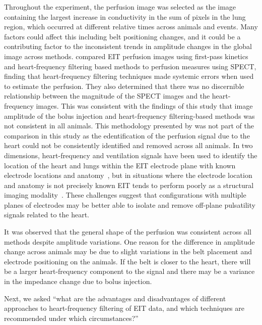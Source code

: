 Throughout the experiment, 
the perfusion image was selected as the image containing 
the largest increase in conductivity in the sum of pixels 
in the lung region, which occurred 
at different relative times across animals and events. Many factors could affect this
including belt positioning changes, and it could be a contributing factor 
to the inconsistent trends in amplitude changes in the global image across methods.
compared EIT perfusion images using first-pass kinetics and 
heart-frequency filtering based methods to perfusion measures using SPECT,
finding that heart-frequency filtering
techniques made systemic errors when used to estimate the perfusion. They also 
determined that there was no discernible relationship between the magnitude of the
SPECT images and the heart-frequency images.
This was consistent with the findings of this study that image amplitude of the bolus injection and 
heart-frequency filtering-based methods was not consistent in all animals.
This methodology presented by 
was not part of the comparison in this study as the edentification of the 
perfusion signal due to the heart could not be consistently
identified and removed across all animals.
In two dimensions, heart-frequency and ventilation signals 
have been used to identify the location 
of the heart and lungs within the EIT electrode plane with known electrode 
locations and anatomy~\parencite{ferrario_toward_2012}, but in situations where the electrode 
location and anatomy is not precisely known EIT tends to perform poorly as a structural 
imaging modality~\parencite{adler_electrical_2017}.
These challenges suggest that configurations with multiple planes of electrodes 
may be better able to isolate and remove off-plane 
pulsatility signals related to the heart.

It was observed that the general shape of 
the perfusion was consistent across all methods despite amplitude variations. 
One reason for the difference in amplitude change across animals may be due 
to slight variations in the belt placement and electrode positioning on the animals.
If the belt is closer to the heart, there will be a larger heart-frequency component 
to the signal and there may be a variance in the impedance change due to bolus injection.

Next, we asked ``what are the advantages and disadvantages of different approaches
to heart-frequency filtering of EIT data, and which techniques are recommended
under which circumstances?''

